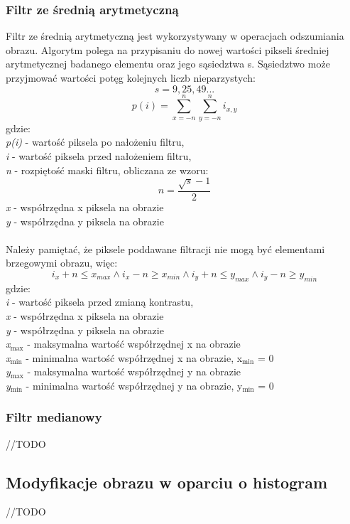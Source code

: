 \documentclass{classrep}
\begin{document}
\subsubsection{Filtr ze średnią arytmetyczną}
Filtr ze średnią arytmetyczną jest wykorzystywany w operacjach odszumiania obrazu. Algorytm polega na przypisaniu do nowej wartości pikseli średniej arytmetycznej badanego elementu oraz jego sąsiedztwa s. Sąsiedztwo może przyjmować wartości potęg kolejnych liczb nieparzystych:\\
\[ s = {9,25,49...} \]
\[ p(i) = \displaystyle\sum_{x=-n}^{n}\displaystyle\sum_{y=-n}^{n} i_{x,y} \]
gdzie:\\
\textit{p(i)} - wartość piksela po nałożeniu filtru,\\
\textit{i} - wartość piksela przed nałożeniem filtru,\\
\textit{n} - rozpiętość maski filtru, obliczana ze wzoru:\\
\[ n = \frac{\sqrt{s}-1}{2} \]
\textit{x} - współrzędna x piksela na obrazie\\
\textit{y} - współrzędna y piksela na obrazie\\
\\
Należy pamiętać, że piksele poddawane filtracji nie mogą być elementami brzegowymi obrazu, więc:
\[ i_x + n \leq x_{max} \wedge i_x - n \geq x_{min} \wedge i_y + n \leq y_{max} \wedge i_y - n \geq y_{min} \]
gdzie:\\
\textit{i} - wartość piksela przed zmianą kontrastu,\\
\textit{x} - współrzędna x piksela na obrazie\\
\textit{y} - współrzędna y piksela na obrazie\\
\textit{x$_{\text{max}}$} - maksymalna wartość współrzędnej x na obrazie\\
\textit{x$_{\text{min}}$} - minimalna wartość współrzędnej x na obrazie, x$_{\text{min}}$ = 0\\
\textit{y$_{\text{max}}$} - maksymalna wartość współrzędnej y na obrazie\\
\textit{y$_{\text{min}}$} - minimalna wartość współrzędnej y na obrazie, y$_{\text{min}}$ = 0\\



\subsubsection{Filtr medianowy}
//TODO

\subsection{Modyfikacje obrazu w oparciu o histogram}
//TODO
\end{document}

